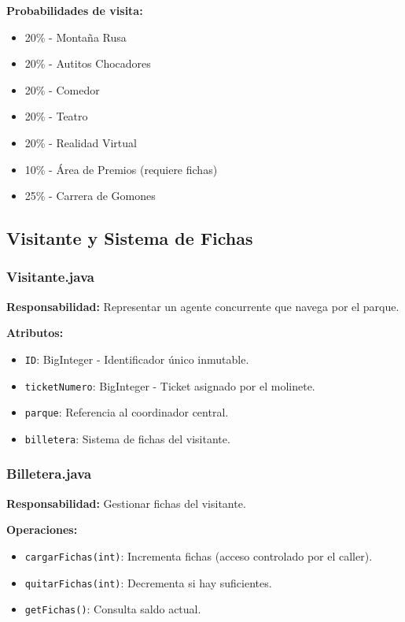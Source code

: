 \documentclass[12pt,a4paper]{article}
\begin{document}
\textbf{Probabilidades de visita:}
\begin{itemize}
    \item 20\% - Montaña Rusa
    \item 20\% - Autitos Chocadores
    \item 20\% - Comedor
    \item 20\% - Teatro
    \item 20\% - Realidad Virtual
    \item 10\% - Área de Premios (requiere fichas)
    \item 25\% - Carrera de Gomones
\end{itemize}

\newpage

\subsection{Visitante y Sistema de Fichas}

\subsubsection{Visitante.java}

\textbf{Responsabilidad:} Representar un agente concurrente que navega por el parque.

\textbf{Atributos:}
\begin{itemize}
    \item \texttt{ID}: BigInteger - Identificador único inmutable.
    \item \texttt{ticketNumero}: BigInteger - Ticket asignado por el molinete.
    \item \texttt{parque}: Referencia al coordinador central.
    \item \texttt{billetera}: Sistema de fichas del visitante.
\end{itemize}

\subsubsection{Billetera.java}

\textbf{Responsabilidad:} Gestionar fichas del visitante.

\textbf{Operaciones:}
\begin{itemize}
    \item \texttt{cargarFichas(int)}: Incrementa fichas (acceso controlado por el caller).
    \item \texttt{quitarFichas(int)}: Decrementa si hay suficientes.
    \item \texttt{getFichas()}: Consulta saldo actual.
\end{itemize}
\end{document}
